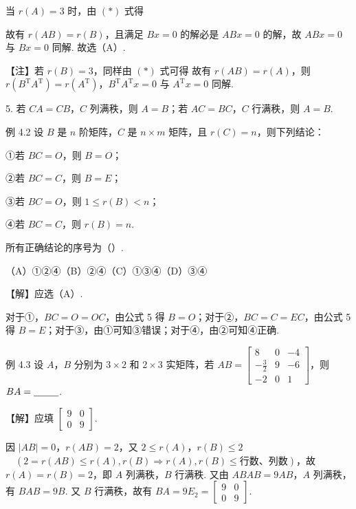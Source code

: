 当 $r(A)=3$ 时，由 $(*)$ 式得

故有 $r(AB)=r(B)$，且满足 $Bx=0$ 的解必是 $ABx=0$ 的解，故 $ABx=0$ 与 $Bx=0$ 同解. 故选（A）.


\begin{fnote}
【注】若 $r(B)=3$，同样由 $(*)$ 式可得
故有 $r(AB)=r(A)$，则 $r(B^{\mathrm T}A^{\mathrm T})=r(A^{\mathrm T})$，$B^{\mathrm T}A^{\mathrm T}x=0$ 与 $A^{\mathrm T}x=0$ 同解.
\end{fnote}

5. 若 $CA=CB$，$C$ 列满秩，则 $A=B$；若 $AC=BC$，$C$ 行满秩，则 $A=B$.

\begin{fcard}{例 4.2}
设 $B$ 是 $n$ 阶矩阵，$C$ 是 $n\times m$ 矩阵，且 $r(C)=n$，则下列结论：

①若 $BC=O$，则 $B=O$；

②若 $BC=C$，则 $B=E$；

③若 $BC=O$，则 $1\le r(B)<n$；

④若 $BC=C$，则 $r(B)=n$.

所有正确结论的序号为（\quad）.

（A）①②④\qquad（B）②④\qquad（C）①③④\qquad（D）③④
\end{fcard}

【解】应选（A）.

对于①，$BC=O=OC$，由公式 5 得 $B=O$；对于②，$BC=C=EC$，由公式 5 得 $B=E$；对于③，由①可知③错误；对于④，由②可知④正确.

\begin{fcard}{例 4.3}
设 $A$，$B$ 分别为 $3\times 2$ 和 $2\times 3$ 实矩阵，若 $AB=\begin{bmatrix}8&0&-4\\-\frac32&9&-6\\-2&0&1\end{bmatrix}$，则 $BA=\underline{\hspace{2.6em}}$.
\end{fcard}

【解】应填 $\begin{bmatrix}9&0\\0&9\end{bmatrix}$.

因 $|AB|=0$，$r(AB)=2$，又 $2\le r(A)$，$r(B)\le 2$ $\quad(2=r(AB)\le r(A),r(B)\Rightarrow r(A),r(B)\le\text{行数、列数})$，故 $r(A)=r(B)=2$，即 $A$ 列满秩，$B$ 行满秩. 又由 $ABAB=9AB$，$A$ 列满秩，有 $BAB=9B$. 又 $B$ 行满秩，故有 $BA=9E_2=\begin{bmatrix}9&0\\0&9\end{bmatrix}$.

